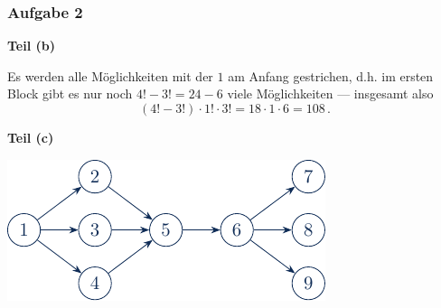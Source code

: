 \documentclass{beamer}
\begin{document}
\begin{frame} \frametitle{Aufgabe 2}
	\textbf{Teil (b)}
	
	Es werden alle Möglichkeiten mit der $1$ am Anfang gestrichen, d.h. im ersten Block gibt es nur noch $4! - 3! = 24 - 6$ viele Möglichkeiten --- insgesamt also 
	\begin{equation*}
		(4! - 3!) \cdot 1! \cdot 3! = 18 \cdot 1 \cdot 6 = 108 \, .
	\end{equation*}

	\pause
	
	\textbf{Teil (c)}
	\begin{center}
		\includegraphics[width=0.7\linewidth]{tut10-aufgabe2c}
	\end{center}
\end{frame}
\end{document}
